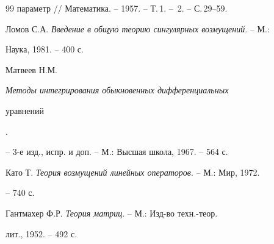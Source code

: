 \begin{thebibliography}{99}
{параметр} // Математика. -- 1957. -- Т.\,1. -- \No\,2. -- С.\,29--59. 




Ломов С.А. {\em Введение в общую теорию сингулярных возмущений}. -- М.: 


Наука, 1981. -- 400 с. 




Матвеев Н.М. {\em Методы интегрирования обыкновенных дифференциальных 


уравнений}. 


-- 3-е изд., испр. и доп. -- М.: Высшая школа, 1967. -- 564 с. 




Като Т. {\em Теория возмущений линейных операторов}. -- М.: Мир, 1972. 


-- 740 с. 




Гантмахер Ф.Р. {\em Теория матриц}. -- М.: Изд-во техн.-теор. 


лит., 1952. -- 492 с. 


 


\end{thebibliography} 


 


\vskip 2cm 


 






 


\label{end} 


 


